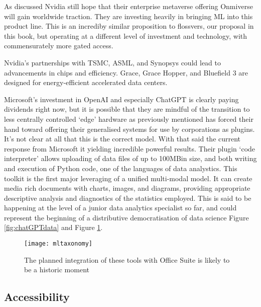 As discussed Nvidia still hope that their enterprise metaverse offering Onmiverse will gain worldwide traction. They are investing heavily in bringing ML into this product line. This is an incrediby similar proposition to flossvers, our proposal in this book, but operating at a different level of investment and technology, with commensurately more gated access. \par
Nvidia's partnerships with TSMC, ASML, and Synopsys could lead to advancements in chips and efficiency. Grace, Grace Hopper, and Bluefield 3 are designed for energy-efficient accelerated data centers.\par
Microsoft's investment in OpenAI and especially ChatGPT is clearly paying dividends right now, but it is possible that they are mindful of the transition to less centrally controlled `edge' hardware as previously mentioned has forced their hand toward offering their generalised systems for use by corporations as plugins. It's not clear at all that this is the correct model. With that said the current response from Microsoft it yielding incredible powerful results. Their plugin `code interpreter' allows uploading of data files of up to 100MBin size, and both writing and execution of Python code, one of the languages of data analystics. This toolkit is the first major leveraging of a unified multi-modal model. It can create media rich documents with charts, images, and diagrams, providing appropriate descriptive analysis and diagnostics of the statistics employed. This is said to be happening at the level of a junior data analytics specialist so far, and could represent the beginning of a distributive democratisation of data science Figure \ref{fig:chatGPTdata} and Figure \ref{fig:chatGPTword}.


\begin{figure}
  \centering
    \texttt{[image: mltaxonomy]}
  \caption{The planned integration of these tools with Office Suite is likely to be a historic moment}
  \label{fig:chatGPTword}
\end{figure}


\subsection{Accessibility}
